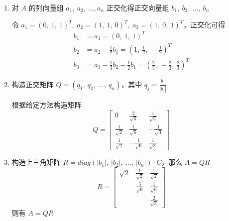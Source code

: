             \begin{solution}
                \begin{enumerate}
                    \item 对 $A$ 的列向量组 $a_1, \ a_2, \ \dots, a_n$ 正交化得正交向量组 $b_1, \ b_2, \ \dots, \ b_n$
                        \par 令 $a_1 = (0, \ 1, \ 1)^T, \ a_2 = (1, \ 1, \ 0)^T, \ a_3 = (1, \ 0, \ 1)^T$，正交化可得
                        \begin{align*}
                            b_1 &= a_1 = (0, \ 1, \ 1)^T \\ b_2 &= a_2 - \frac{1}{2}b_1 = (1, \ \frac{1}{2}, \ -\frac{1}{2})^T \\ b_3 &= a_3 - \frac{1}{3}b_2 - \frac{1}{2}b_1 = (\frac{2}{3}, \ -\frac{2}{3}, \ \frac{2}{3})^T
                        \end{align*}
                    \item 构造正交矩阵 $Q = (q_1, \ q_2, \ \dots, \ q_n)$，其中 $q_j = \frac{b_j}{|b_j|}$
                        \par 根据给定方法构造矩阵
                        \begin{equation*}
                            Q = \begin{bmatrix}
                                0 & \frac{2}{\sqrt{6}} & \frac{1}{\sqrt{3}} \\ \frac{1}{\sqrt{2}} & \frac{1}{\sqrt{6}} & -\frac{1}{\sqrt{3}} \\ \frac{1}{\sqrt{2}} & -\frac{1}{\sqrt{6}} & \frac{1}{\sqrt{3}}
                            \end{bmatrix}
                        \end{equation*}
                    \item 构造上三角矩阵 $R = diag(|b_1|, \ |b_2|, \ \dots, \ |b_n|)\cdot C$，那么 $A = QR$
                        \begin{equation*}
                            R = \begin{bmatrix}
                                \sqrt{2} & \frac{1}{\sqrt{2}} & \frac{1}{\sqrt{2}} \\ & \frac{3}{\sqrt{6}} & \frac{1}{\sqrt{6}} \\ & & \frac{2}{\sqrt{3}}
                            \end{bmatrix}
                        \end{equation*}
                        则有 $A = QR$
                \end{enumerate}
            \end{solution}
